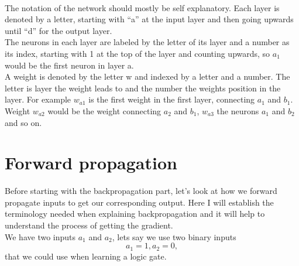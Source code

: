 \documentclass[11pt, halfparskip]{article}
\begin{document}
     	\noindent \\
     	The notation of the network should mostly be self explanatory. Each layer is denoted by a letter, starting with ``a'' at the input layer and then going upwards until ``d'' for the
     	output layer.\\
     	The neurons in each layer are labeled by the letter of its layer and a number as its index, starting with 1 at the top of the layer and counting upwards, so $a_1$ would be the first 
     	neuron in layer a.\\
     	A weight is denoted by the letter w and indexed by a letter and a number. The letter is layer the weight leads to and the number the weights position in the layer. For example
     	$w_{a1}$ is the first weight in the first layer, connecting $a_1$ and $b_1$. Weight $w_{a2}$ would be the weight connecting $a_2$ and $b_1$, $w_{a3}$ the neurons $a_1$ 
     	and $b_2$ and so on.
     
    \section{Forward propagation}
    \label{sec:forward_propagation}
        Before starting with the backpropagation part,  let's look at how we forward propagate inputs to get our corresponding output. Here I will establish the terminology needed when
        explaining backpropagation and it will help to understand the process of getting the gradient.\\
        We have two inputs $a_1$ and $a_2$, lets say we use two binary inputs 
        \[
	    a_1 = 1,
	    a_2 = 0,
        \]
        that we could use when learning a logic gate.
    
\end{document}

